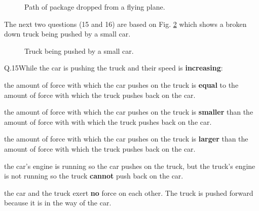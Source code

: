     \newpage

    \begin{figure}[h!]
        \begin{center}
            
            \caption{\label{fig:plane} Path of package dropped from a flying plane.\protect\endnotemark}
        \end{center}
    \end{figure}

    \eline[2]
    The next two questions (15 and 16) are based on Fig. \ref{fig:vehicles} which shows a broken down truck being pushed by a small car. 

    \begin{figure}[h!]
       \begin{center}
          
          \caption{\label{fig:vehicles} Truck being pushed by a small car.\protect\endnotemark}
       \end{center}
    \end{figure}

    \eline[-1]
    \begin{mcq}{Q.15}{While the car is pushing the truck and their speed is \textbf{increasing}:}
      \item the amount of force with which the car pushes on the truck is \textbf{equal} to the amount of force with which the truck pushes back on the car.
      \item the amount of force with which the car pushes on the truck is \textbf{smaller} than the amount of force with with which the truck pushes back on the car.
      \item the amount of force with which the car pushes on the truck is \textbf{larger} than the amount of force with which the truck pushes back on the car.
      \item the car's engine is running so the car pushes on the truck, but the truck's engine is not running so the truck \textbf{cannot} push back on the car.
      \item the car and the truck exert \textbf{no} force on each other. The truck is pushed forward because it is in the way of the car.
    \end{mcq}

